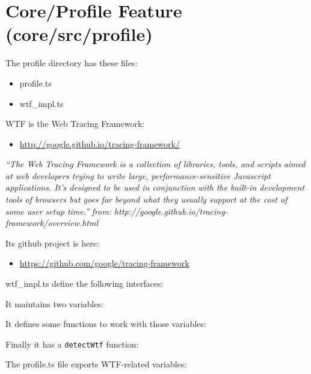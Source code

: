 \section{Core/Profile Feature (core/src/profile)}

The profile directory has these files:

\begin{itemize}
  \item profile.ts
  \item wtf\_impl.ts
\end{itemize}

WTF is the Web Tracing Framework:

\begin{itemize}
  \item \url{http://google.github.io/tracing-framework/}
\end{itemize}

\emph{“The Web Tracing Framework is a collection of libraries, tools, and scripts}
\emph{aimed at web developers trying to write large, performance-sensitive}
\emph{Javascript applications. It's designed to be used in conjunction with the}
\emph{built-in development tools of browsers but goes far beyond what they}
\emph{usually support at the cost of some user setup time.”}
\emph{from:}
\emph{http://google.github.io/tracing-framework/overview.html}

Its github project is here:

\begin{itemize}
  \item \url{https://github.com/google/tracing-framework}
\end{itemize}

wtf\_impl.ts define the following interfaces:



It maintains two variables:



It defines some functions to work with those variables:



Finally it has a
\texttt{detectWtf}
function:



The profile.ts file exports WTF-related variables:


